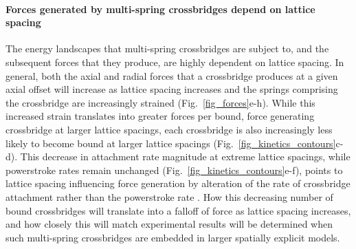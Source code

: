 \documentclass[]{article}
\begin{document}
\paragraph{Forces generated by multi-spring crossbridges depend on lattice spacing} %
The energy landscapes that multi-spring crossbridges are subject to, and the subsequent forces that they produce, are highly dependent on lattice spacing.
In general, both the axial and radial forces that a crossbridge produces at a given axial offset will increase as lattice spacing increases and the springs comprising the crossbridge are increasingly strained (Fig.\ \ref{fig_forces}e-h). 
While this increased strain translates into greater forces per bound, force generating crossbridge at larger lattice spacings, each crossbridge is also increasingly less likely to become bound at larger lattice spacings (Fig.\ \ref{fig_kinetics_contours}c-d).
This decrease in attachment rate magnitude at extreme lattice spacings, while powerstroke rates remain unchanged (Fig.\ \ref{fig_kinetics_contours}e-f), points to lattice spacing influencing force generation by alteration of the rate of crossbridge attachment rather than the powerstroke rate \citet{Martyn2004}. 
How this decreasing number of bound crossbridges will translate into a falloff of force as lattice spacing increases, and how closely this will match experimental results will be determined when such multi-spring crossbridges are embedded in larger spatially explicit models. %
\end{document}
